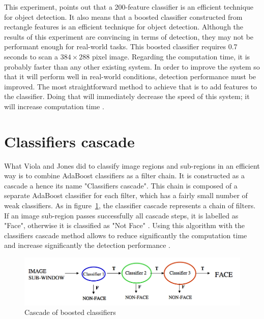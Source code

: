 \noindent This experiment, points out that a 200-feature classifier is an efficient technique for object detection. It also means that a boosted classifier constructed from rectangle features is an efficient technique for object detection. Although the results of this experiment are convincing in terms of detection, they may not be performant enough for real-world tasks. This boosted classifier requires 0.7 seconds to scan a $ 384\times288 $ pixel image. Regarding the computation time, it is probably faster than any other existing system. In order to improve the system so that it will perform well in real-world conditions, detection performance must be improved. The most straightforward method to achieve that is to add features to the classifier. Doing that will immediately decrease the speed of this system; it will increase computation time \cite{VIO01}.
\newline

\section{Classifiers cascade}

\vspace{\baselineskip}
\noindent What Viola and Jones did to classify image regions and sub-regions in an efficient way is to combine AdaBoost classifiers as a filter chain. It is constructed as a cascade a hence its name  "Classifiers cascade". This chain is composed of a separate AdaBoost classifier for each filter, which has a fairly small number of weak classifiers. As in figure~\ref{haar_feature_cascade}, the classifier cascade represents a chain of filters. If an image sub-region passes successfully all cascade steps, it is labelled as "Face", otherwise it is classified as "Not Face" \cite{HEW07}. Using this algorithm with the classifiers cascade method allows to reduce significantly the computation time and increase significantly the detection performance \cite{VIO01}.
\newline

\begin{figure}[!h]
\begin{center}
\noindent \includegraphics[scale=0.5]{figures/haar_feature_cascade} 
\newline
\caption{Cascade of boosted classifiers}
\label{haar_feature_cascade}
\end{center} 
\end{figure}

